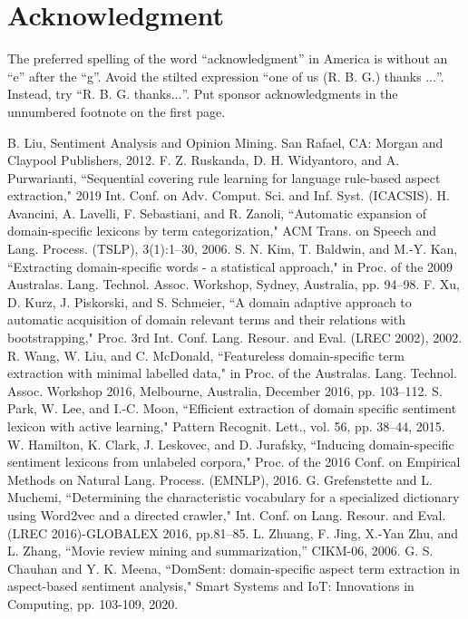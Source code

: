 \documentclass[a4paper,conference]{IEEEtran}
\begin{document}
\section*{Acknowledgment}

The preferred spelling of the word ``acknowledgment'' in America is without 
an ``e'' after the ``g''. Avoid the stilted expression ``one of us (R. B. 
G.) thanks $\ldots$''. Instead, try ``R. B. G. thanks$\ldots$''. Put sponsor 
acknowledgments in the unnumbered footnote on the first page.

\begin{thebibliography}{00}
 B. Liu, Sentiment Analysis and Opinion Mining. San Rafael, CA: Morgan and Claypool Publishers, 2012.
 F. Z. Ruskanda, D. H. Widyantoro, and A. Purwarianti, ``Sequential covering rule learning for language rule-based aspect extraction," 2019 Int. Conf. on Adv. Comput. Sci. and Inf. Syst. (ICACSIS).
 H. Avancini, A. Lavelli, F. Sebastiani, and R. Zanoli, ``Automatic expansion of domain-specific lexicons by term categorization," ACM Trans. on Speech and Lang. Process. (TSLP), 3(1):1–30, 2006.
 S. N. Kim, T. Baldwin, and M.-Y. Kan, ``Extracting domain-specific words - a statistical approach," in Proc. of the 2009 Australas. Lang. Technol. Assoc. Workshop, Sydney, Australia, pp. 94–98.
 F. Xu, D. Kurz, J. Piskorski, and S. Schmeier, ``A domain adaptive approach to automatic acquisition of domain relevant terms and their relations with bootstrapping," Proc. 3rd Int. Conf. Lang. Resour. and Eval. (LREC 2002), 2002.
 R. Wang, W. Liu, and C. McDonald, ``Featureless domain-specific term extraction with minimal labelled data," in Proc. of the Australas. Lang. Technol. Assoc. Workshop 2016, Melbourne, Australia, December 2016, pp. 103–112.
 S. Park, W. Lee, and I.-C. Moon, ``Efficient extraction of domain specific sentiment lexicon with active learning," Pattern Recognit. Lett., vol. 56, pp. 38–44, 2015.
 W. Hamilton, K. Clark, J. Leskovec, and D. Jurafsky, ``Inducing domain-specific sentiment lexicons from unlabeled corpora," Proc. of the 2016 Conf. on Empirical Methods on Natural Lang. Process. (EMNLP), 2016.
 G. Grefenstette and L. Muchemi, ``Determining the characteristic vocabulary for a specialized dictionary using Word2vec and a directed crawler," Int. Conf. on Lang. Resour. and Eval. (LREC 2016)-GLOBALEX 2016, pp.81–85.
 L. Zhuang, F. Jing, X.-Yan Zhu, and L. Zhang, “Movie review mining and summarization,” CIKM-06, 2006.
 G. S. Chauhan and Y. K. Meena, ``DomSent: domain-specific aspect term extraction in aspect-based sentiment analysis," Smart Systems and IoT: Innovations in Computing, pp. 103-109, 2020.

\end{thebibliography}
\end{document}
